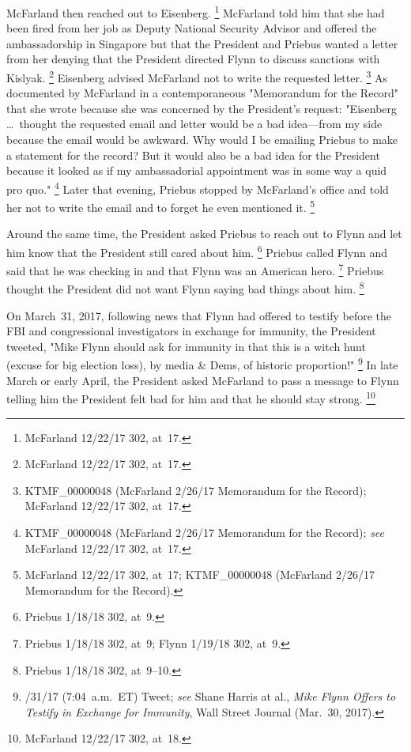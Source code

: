 McFarland then reached out to Eisenberg.%
\footnote{McFarland 12/22/17 302, at~17.}
McFarland told him that she had been fired from her job as Deputy National Security Advisor and offered the ambassadorship in Singapore but that the President and Priebus wanted a letter from her denying that the President directed Flynn to discuss sanctions with Kislyak.%
\footnote{McFarland 12/22/17 302, at~17.}
Eisenberg advised McFarland not to write the requested letter.%
\footnote{KTMF\_00000048 (McFarland 2/26/17 Memorandum for the Record);
McFarland 12/22/17 302, at~17.}
As documented by McFarland in a contemporaneous "Memorandum for the Record" that she wrote because she was concerned by the President's request:
"Eisenberg \dots\ thought the requested email and letter would be a bad idea---from my side because the email would be awkward.
Why would I be emailing Priebus to make a statement for the record?
But it would also be a bad idea for the President because it looked as if my ambassadorial appointment was in some way a quid pro quo."%
\footnote{KTMF\_00000048 (McFarland 2/26/17 Memorandum for the Record);
\textit{see} McFarland 12/22/17 302, at~17.}
Later that evening, Priebus stopped by McFarland's office and told her not to write the email and to forget he even mentioned it.%
\footnote{McFarland 12/22/17 302, at~17;
KTMF\_00000048 (McFarland 2/26/17 Memorandum for the Record).}

Around the same time, the President asked Priebus to reach out to Flynn and let him know that the President still cared about him.%
\footnote{Priebus 1/18/18 302, at~9.}
Priebus called Flynn and said that he was checking in and that Flynn was an American hero.%
\footnote{Priebus 1/18/18 302, at~9;
Flynn 1/19/18 302, at~9.}
Priebus thought the President did not want Flynn saying bad things about him.%
\footnote{Priebus 1/18/18 302, at~9--10.}

On March~31, 2017, following news that Flynn had offered to testify before the FBI and congressional investigators in exchange for immunity, the President tweeted,
"Mike Flynn should ask for immunity in that this is a witch hunt (excuse for big election loss), by media \& Dems, of historic proportion!"%
\footnote{/31/17 (7:04~a.m.~ET) Tweet;
\textit{see} Shane Harris at al., \textit{Mike Flynn Offers to Testify in Exchange for Immunity}, Wall Street Journal (Mar.~30, 2017).}
In late March or early April, the President asked McFarland to pass a message to Flynn telling him the President felt bad for him and that he should stay strong.%
\footnote{McFarland 12/22/17 302, at~18.}

